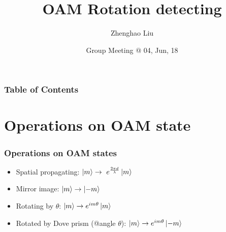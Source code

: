 \documentclass[amssymb, amsmath]{beamer}
\title[Group talk] %
{OAM Rotation detecting}
\subtitle{}
\author[Zhenghao Liu] %
{Zhenghao Liu\inst{1} \inst{2}}
\institute[] %
{
  \inst{1}%
  Key Laboratory of Quantum Informaion, CAS
  \and
  \inst{2}%
  University of Science and Technology of China
}
\date[\today] %
{Group Meeting $@$ 04, Jun, 18}
\begin{document}
\frame{\titlepage}


\begin{frame}
\frametitle{Table of Contents}
\tableofcontents
\end{frame}


\section{Operations on OAM state}

\begin{frame}
\frametitle{Operations on OAM states}

\begin{itemize}
    \item Spatial propagating: $\ket{m}\to\ e^{\frac{2\pi d}{\lambda}}\ket{m}$
    \item Mirror image: $\ket{m}\to\ket{-m}$
    \item Rotating by $\theta$: $\ket{m}\to e^{im\theta}\ket{m}$
    \item Rotated by \textcolor{suoh}{Dove prism} (@angle $\theta$): $\ket{m}\to e^{im\theta}\ket{-m}$
\end{itemize}
\end{frame}
\end{document}
